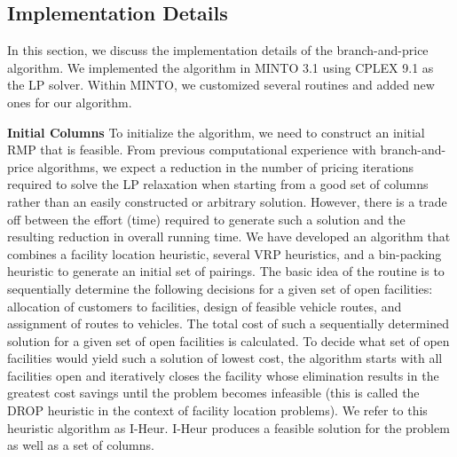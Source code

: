 \documentclass[11pt]{article}
\newcommand{\rtbpapercomment}[1]{\noindent \textcolor{red}{\bf RTB: #1 } }
\begin{document}
\subsection {Implementation Details}    
\label{sec:BPAlgorithm}
In this section, we discuss the implementation details of the branch-and-price algorithm.  We implemented
the algorithm in MINTO 3.1 using CPLEX 9.1 as the LP solver.
Within MINTO, we customized several routines and added new ones for our algorithm.

{\bf Initial Columns} 
To initialize the algorithm, we need to construct an initial RMP that is feasible.
From previous computational experience with branch-and-price algorithms, 
we expect a reduction in the number of pricing iterations required to
solve the LP relaxation when starting from a good set of columns rather than an easily
constructed or arbitrary solution.  
However, there is a trade off between the effort 
(time) required to generate such a solution and the resulting reduction in overall running time. 
We have developed an algorithm that combines a facility location
heuristic, several VRP heuristics, and a bin-packing heuristic to generate an initial set
of pairings.  The basic idea of the routine is to sequentially determine the 
following decisions for a given set of open facilities: 
allocation of customers to facilities, design of feasible vehicle routes, and 
assignment of routes to vehicles. 
The total cost of such a sequentially determined solution for a given set of open facilities is 
calculated. To decide what set of open facilities would yield such a solution of
lowest cost, the algorithm starts with all facilities open and iteratively closes  
the facility whose elimination results in the greatest cost savings until the problem 
becomes infeasible (this is called the DROP heuristic in the context of facility location problems).
We refer to this heuristic algorithm as I-Heur. I-Heur produces a feasible solution
for the problem as well as a set of columns. 
\end{document}
